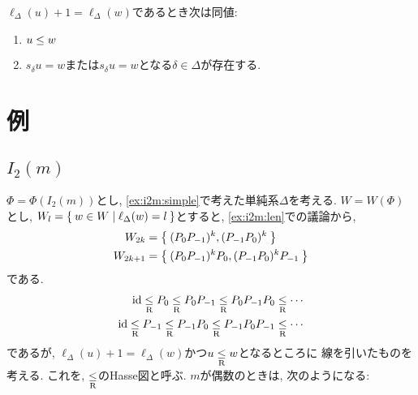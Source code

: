 \begin{prop}
  $\ell_\Delta(u)+1=\ell_\Delta(w)$であるとき次は同値:
  \begin{enumerate}
  \item $u\mathrel{\leq} w$
  \item $s_{\delta} u= w$または$s_{\delta} u= w$となる$\delta\in\Delta$が存在する.
  \end{enumerate}
\end{prop}


\section{例}
\subsection{$I_2(m)$}
$\Phi=\Phi(I_2(m))$とし,
\cref{ex:i2m:simple}で考えた単純系$\Delta$を考える.
$W=W(\Phi)$とし,
$W_l=\Set{w\in W|\ell_\Delta(w)=l}$とすると,
\cref{ex:i2m:len}での議論から,
\begin{align*}
  W_{2k}&=\Set{(P_0P_{-1})^k, (P_{-1}P_0)^k}\\
  W_{2k+1}&=\Set{(P_0P_{-1})^kP_0, (P_{-1}P_0)^kP_{-1}}\\
\end{align*}
である.
\begin{align*}
  \operatorname{id} \mathrel{\underset{\text{R}}{\leq}}  P_0  \mathrel{\underset{\text{R}}{\leq}}  P_0P_{-1} \mathrel{\underset{\text{R}}{\leq}}  P_0P_{-1}P_0 \mathrel{\underset{\text{R}}{\leq}} \cdots\\
  \operatorname{id} \mathrel{\underset{\text{R}}{\leq}}  P_{-1}  \mathrel{\underset{\text{R}}{\leq}}  P_{-1}P_0 \mathrel{\underset{\text{R}}{\leq}}  P_{-1}P_0P_{-1} \mathrel{\underset{\text{R}}{\leq}} \cdots
\end{align*}
であるが, $\ell_\Delta(u)+1=\ell_\Delta(w)$かつ$u \mathrel{\underset{\text{R}}{\leq}} w$となるところに
線を引いたものを考える.
これを, $\mathrel{\underset{\text{R}}{\leq}}$のHasse図と呼ぶ.
$m$が偶数のときは, 次のようになる:
